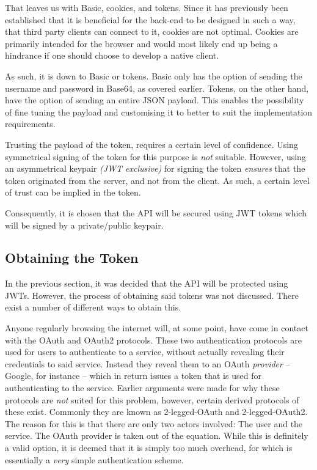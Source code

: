 				That leaves us with Basic, cookies, and tokens. Since it has previously been established that it is beneficial for the back-end to be designed in such a way, that third party clients can connect to it, cookies are not optimal. Cookies are primarily intended for the browser and would most likely end up being a hindrance if one should choose to develop a native client.

				As such, it is down to Basic or tokens. Basic only has the option of sending the username and password in Base64, as covered earlier. Tokens, on the other hand, have the option of sending an entire JSON payload. This enables the possibility of fine tuning the payload and customising it to better to suit the implementation requirements. 

				Trusting the payload of the token, requires a certain level of confidence. Using symmetrical signing of the token for this purpose is \emph{not} suitable. However, using an asymmetrical keypair \emph{(JWT exclusive)} for signing the token \emph{ensures} that the token originated from the server, and not from the client. As such, a certain level of trust can be implied in the token.

				Consequently, it is chosen that the API will be secured using JWT tokens which will be signed by a private/public keypair.

		\subsection{Obtaining the Token}
			In the previous section, it was decided that the API will be protected using JWTs. However, the process of obtaining said tokens was not discussed. There exist a number of different ways to obtain this.

			Anyone regularly browsing the internet will, at some point, have come in contact with the OAuth and OAuth2 protocols. These two authentication protocols are used for users to authenticate to a service, without actually revealing their credentials to said service. Instead they reveal them to an OAuth \emph{provider} -- Google, for instance -- which in return issues a token that is used for authenticating to the service. Earlier arguments were made for why these protocols are \emph{not} suited for this problem, however, certain derived protocols of these exist. Commonly they are known as 2-legged-OAuth and 2-legged-OAuth2. The reason for this is that there are only two actors involved: The user and the service. The OAuth provider is taken out of the equation. While this is definitely a valid option, it is deemed that it is simply too much overhead, for which is essentially a \emph{very} simple authentication scheme.

